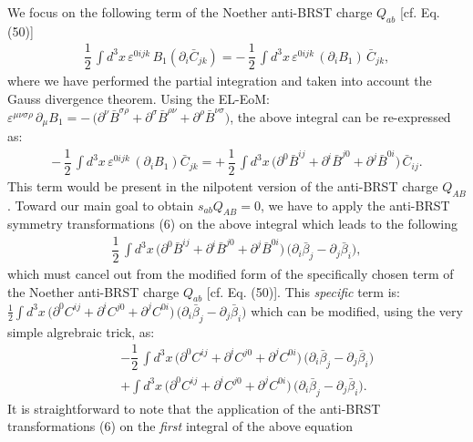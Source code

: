 \documentclass[12pt]{article}
\begin{document}
We focus on the following term of the Noether anti-BRST charge $Q_{ab}$ [cf. Eq. (50)]
\begin{eqnarray}\label{54}
\dfrac{1}{2}\, \int d^3 x\, \varepsilon^{0ijk}\, B_1 (\partial_i \bar C_{jk}) = -\, 
\dfrac{1}{2}\, \int d^3 x\, \varepsilon^{0ijk}\, (\partial_i B_1) \, \bar C_{jk},
\end{eqnarray}
where we have performed the partial integration and taken into account the Gauss divergence theorem. Using the EL-EoM:
$ \varepsilon^{\mu\nu\sigma\rho}\, \partial_\mu B_1 
= -\, \big (\partial^\nu \bar B^{\sigma\rho} + \partial^\sigma \bar B^{\rho\nu}  + \partial^\rho \bar B^{\nu\sigma} \big )$, the above integral can be 
re-expressed as: 
\begin{eqnarray}\label{55}
-\,\dfrac{1}{2}\, \int d^3 x\, \varepsilon^{0ijk}\, (\partial_i B_1)  \bar C_{jk} = +\,
\dfrac{1}{2}\, \int d^3 x\,\big (\partial^0 \bar B^{ij} + \partial^i\bar B^{j0}  + \partial^j \bar B^{0i} \big )\, \bar C_{ij}.
\end{eqnarray}
This term would be present in the nilpotent version of the anti-BRST charge $Q_{AB}$. Toward our main goal to obtain $s_{ab} Q_{AB} = 0$, we have to
apply the anti-BRST symmetry transformations (6) on the above integral which leads to the following
\begin{eqnarray}\label{56}
\dfrac{1}{2}\, \int d^3 x\,\big (\partial^0 \bar B^{ij} + \partial^i\bar B^{j0}  + \partial^j \bar B^{0i} \big )\, 
\big (\partial _i \bar \beta_j - \partial _j \bar \beta_i\big ),
\end{eqnarray}
which must cancel out from the modified form of the specifically chosen term of the 
Noether anti-BRST charge $Q_{ab}$ [cf. Eq. (50)]. This {\it specific} term is:
$\frac{1}{2} \int d^3 x \, \big (\partial^0 C^{ij} + \partial^i C^{j0}  + \partial^j C^{0i} \big )\, 
\big (\partial _i \bar \beta_j - \partial _j \bar \beta_i\big ) $ which can be modified, using the very simple algrebraic trick, as:
\begin{eqnarray}\label{57}
&&- \dfrac{1}{2}\, \int d^3 x\,\big (\partial^0 C^{ij} + \partial^i C^{j0}  + \partial^j C^{0i} \big )\, 
\big (\partial _i \bar \beta_j - \partial _j \bar \beta_i\big ) \nonumber\\
&& +  
\int d^3 x\,\big (\partial^0 C^{ij} + \partial^i C^{j0}  + \partial^j C^{0i} \big )\, 
\big (\partial _i \bar \beta_j - \partial _j \bar \beta_i\big ).
\end{eqnarray}
It is straightforward to note that the application of the anti-BRST transformations (6) on the {\it first} integral of the above equation
\end{document}
